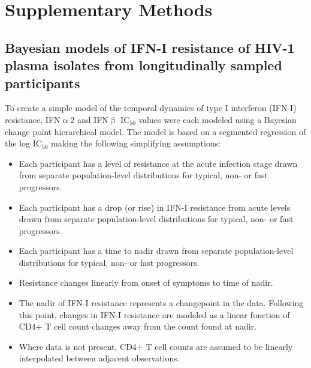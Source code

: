 \documentclass[12pt]{article}
\newcommand{\ifna}{IFN\hspace{-.08em}${\upalpha 2}$}
\newcommand{\ifnb}{IFN\hspace{-.03em}${\upbeta}$}
\newcommand{\icFifty}{IC$_{50}$}
\begin{document}
\section*{Supplementary Methods}
\subsection*{Bayesian models of IFN-I resistance of HIV-1 plasma isolates from longitudinally sampled participants}
To create a simple model of the temporal dynamics of type I interferon (IFN-I) resistance, \ifna{} and \ifnb{} \icFifty{} values were each modeled using a Bayesian change point hierarchical model.
  The model is based on a segmented regression of the log \icFifty{} making the following simplifying assumptions:
    \begin{itemize}
          \item Each participant has a level of resistance at the acute infection stage drawn from separate population-level distributions for typical, non- or fast progressors.
          \item Each participant has a drop (or rise) in IFN-I resistance from acute levels drawn from separate population-level distributions for typical, non- or fast progressors.
          \item Each participant has a time to nadir drawn from separate population-level distributions for typical, non- or fast progressors.
          \item Resistance changes linearly from onset of symptoms to time of nadir.
          \item The nadir of IFN-I resistance represents a changepoint in the data. Following this point, changes in IFN-I resistance are modeled as a linear function of CD4+ T cell count changes away from the count found at nadir.
          \item Where data is not present, CD4+ T cell counts are assumed to be linearly interpolated between adjacent observations.
    \end{itemize}
  
\end{document}
